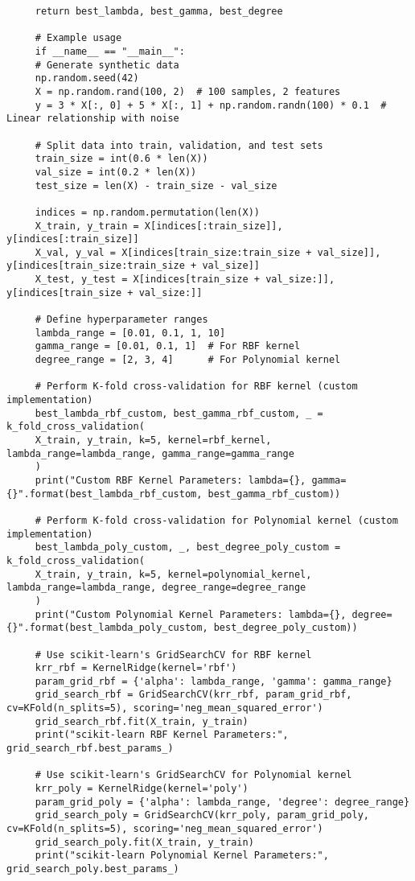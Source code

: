 \documentclass[letterpaper]{article}
\begin{document}
\begin{lstlisting}
     return best_lambda, best_gamma, best_degree
     
     # Example usage
     if __name__ == "__main__":
     # Generate synthetic data
     np.random.seed(42)
     X = np.random.rand(100, 2)  # 100 samples, 2 features
     y = 3 * X[:, 0] + 5 * X[:, 1] + np.random.randn(100) * 0.1  # Linear relationship with noise
     
     # Split data into train, validation, and test sets
     train_size = int(0.6 * len(X))
     val_size = int(0.2 * len(X))
     test_size = len(X) - train_size - val_size
     
     indices = np.random.permutation(len(X))
     X_train, y_train = X[indices[:train_size]], y[indices[:train_size]]
     X_val, y_val = X[indices[train_size:train_size + val_size]], y[indices[train_size:train_size + val_size]]
     X_test, y_test = X[indices[train_size + val_size:]], y[indices[train_size + val_size:]]
     
     # Define hyperparameter ranges
     lambda_range = [0.01, 0.1, 1, 10]
     gamma_range = [0.01, 0.1, 1]  # For RBF kernel
     degree_range = [2, 3, 4]      # For Polynomial kernel
     
     # Perform K-fold cross-validation for RBF kernel (custom implementation)
     best_lambda_rbf_custom, best_gamma_rbf_custom, _ = k_fold_cross_validation(
     X_train, y_train, k=5, kernel=rbf_kernel, lambda_range=lambda_range, gamma_range=gamma_range
     )
     print("Custom RBF Kernel Parameters: lambda={}, gamma={}".format(best_lambda_rbf_custom, best_gamma_rbf_custom))
     
     # Perform K-fold cross-validation for Polynomial kernel (custom implementation)
     best_lambda_poly_custom, _, best_degree_poly_custom = k_fold_cross_validation(
     X_train, y_train, k=5, kernel=polynomial_kernel, lambda_range=lambda_range, degree_range=degree_range
     )
     print("Custom Polynomial Kernel Parameters: lambda={}, degree={}".format(best_lambda_poly_custom, best_degree_poly_custom))
     
     # Use scikit-learn's GridSearchCV for RBF kernel
     krr_rbf = KernelRidge(kernel='rbf')
     param_grid_rbf = {'alpha': lambda_range, 'gamma': gamma_range}
     grid_search_rbf = GridSearchCV(krr_rbf, param_grid_rbf, cv=KFold(n_splits=5), scoring='neg_mean_squared_error')
     grid_search_rbf.fit(X_train, y_train)
     print("scikit-learn RBF Kernel Parameters:", grid_search_rbf.best_params_)
     
     # Use scikit-learn's GridSearchCV for Polynomial kernel
     krr_poly = KernelRidge(kernel='poly')
     param_grid_poly = {'alpha': lambda_range, 'degree': degree_range}
     grid_search_poly = GridSearchCV(krr_poly, param_grid_poly, cv=KFold(n_splits=5), scoring='neg_mean_squared_error')
     grid_search_poly.fit(X_train, y_train)
     print("scikit-learn Polynomial Kernel Parameters:", grid_search_poly.best_params_)
     

\end{lstlisting}
\end{document}
